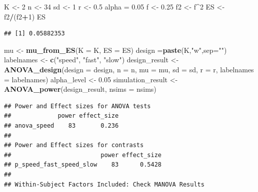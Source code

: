 \documentclass[]{book}
\newenvironment{Shaded}{\begin{snugshade}}{\end{snugshade}}
\newcommand{\DataTypeTok}[1]{\textcolor[rgb]{0.13,0.29,0.53}{#1}}
\newcommand{\DecValTok}[1]{\textcolor[rgb]{0.00,0.00,0.81}{#1}}
\newcommand{\FloatTok}[1]{\textcolor[rgb]{0.00,0.00,0.81}{#1}}
\newcommand{\KeywordTok}[1]{\textcolor[rgb]{0.13,0.29,0.53}{\textbf{#1}}}
\newcommand{\NormalTok}[1]{#1}
\newcommand{\OperatorTok}[1]{\textcolor[rgb]{0.81,0.36,0.00}{\textbf{#1}}}
\newcommand{\StringTok}[1]{\textcolor[rgb]{0.31,0.60,0.02}{#1}}
\begin{document}
\begin{Shaded}
\begin{Highlighting}[]
\NormalTok{K <-}\StringTok{ }\DecValTok{2}
\NormalTok{n <-}\StringTok{ }\DecValTok{34}
\NormalTok{sd <-}\StringTok{ }\DecValTok{1}
\NormalTok{r <-}\StringTok{ }\FloatTok{0.5}
\NormalTok{alpha =}\StringTok{ }\FloatTok{0.05}
\NormalTok{f <-}\StringTok{ }\FloatTok{0.25}
\NormalTok{f2 <-}\StringTok{ }\NormalTok{f}\OperatorTok{^}\DecValTok{2}
\NormalTok{ES <-}\StringTok{ }\NormalTok{f2}\OperatorTok{/}\NormalTok{(f2}\OperatorTok{+}\DecValTok{1}\NormalTok{)}
\NormalTok{ES}
\end{Highlighting}
\end{Shaded}

\begin{verbatim}
## [1] 0.05882353
\end{verbatim}

\begin{Shaded}
\begin{Highlighting}[]
\NormalTok{mu <-}\StringTok{ }\KeywordTok{mu_from_ES}\NormalTok{(}\DataTypeTok{K =}\NormalTok{ K, }\DataTypeTok{ES =}\NormalTok{ ES)}
\NormalTok{design =}\KeywordTok{paste}\NormalTok{(K,}\StringTok{"w"}\NormalTok{,}\DataTypeTok{sep=}\StringTok{""}\NormalTok{)}
\NormalTok{labelnames <-}\StringTok{ }\KeywordTok{c}\NormalTok{(}\StringTok{"speed"}\NormalTok{, }\StringTok{"fast"}\NormalTok{, }\StringTok{"slow"}\NormalTok{)}
\NormalTok{design_result <-}\StringTok{ }\KeywordTok{ANOVA_design}\NormalTok{(}\DataTypeTok{design =}\NormalTok{ design,}
                   \DataTypeTok{n =}\NormalTok{ n, }
                   \DataTypeTok{mu =}\NormalTok{ mu, }
                   \DataTypeTok{sd =}\NormalTok{ sd, }
                   \DataTypeTok{r =}\NormalTok{ r, }
                   \DataTypeTok{labelnames =}\NormalTok{ labelnames)}
\NormalTok{alpha_level <-}\StringTok{ }\FloatTok{0.05}
\NormalTok{simulation_result <-}\StringTok{ }\KeywordTok{ANOVA_power}\NormalTok{(design_result, }\DataTypeTok{nsims =}\NormalTok{ nsims)}
\end{Highlighting}
\end{Shaded}

\begin{verbatim}
## Power and Effect sizes for ANOVA tests
##             power effect_size
## anova_speed    83       0.236
## 
## Power and Effect sizes for contrasts
##                         power effect_size
## p_speed_fast_speed_slow    83      0.5428
## 
## Within-Subject Factors Included: Check MANOVA Results
\end{verbatim}
\end{document}
